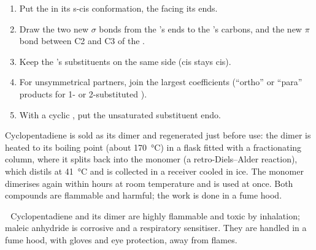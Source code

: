 \begin{method}\label{met:b2:frontier-orbitals:diels-alder}
\begin{enumerate}
  \item Put the  in its s-cis conformation, the  facing its ends.
  \item Draw the two new $\sigma$ bonds from the 's ends to the 's carbons,
        and the new $\pi$ bond between C2 and C3 of the .
  \item Keep the 's substituents on the same side (cis stays cis).
  \item For unsymmetrical partners, join the largest coefficients (``ortho'' or ``para''
        products for 1- or 2-substituted ).
  \item With a cyclic , put the unsaturated substituent endo.
\end{enumerate}
\end{method}

\begin{inthelab}
Cyclopentadiene is sold as its dimer and regenerated just before use: the dimer is
heated to its boiling point (about \qty{170}{\degreeCelsius}) in a flask fitted with a
fractionating column, where it splits back into the monomer (a retro-Diels--Alder
reaction), which distils at \qty{41}{\degreeCelsius} and is collected in a receiver cooled
in ice. The monomer dimerises again within hours at room temperature and is used at
once. Both compounds are flammable and harmful; the work is done in a fume hood.
\end{inthelab}

\begin{safety}{\,\,}
Cyclopentadiene and its dimer are highly flammable and toxic by inhalation; maleic
anhydride is corrosive and a respiratory sensitiser. They are handled in a fume hood,
with gloves and eye protection, away from flames.
\end{safety}

